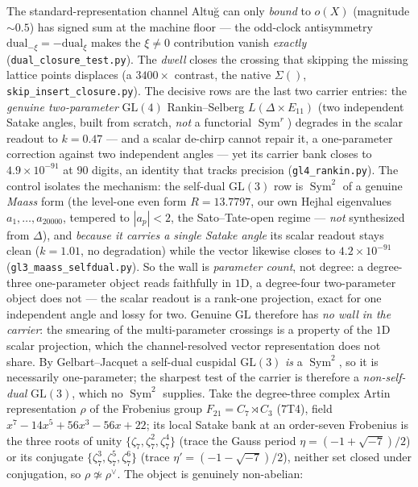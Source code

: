 \documentclass[11pt]{article}
\theoremstyle{definition}
\newcommand{\Sym}{\operatorname{Sym}}
\begin{document}
The standard-representation channel Altu\u{g} can only \emph{bound} to $o(X)$ (magnitude $\sim0.5$) has signed
sum at the machine floor --- the odd-clock antisymmetry $\mathrm{dual}_{-\xi}=-\mathrm{dual}_{\xi}$ makes the
$\xi\neq0$ contribution vanish \emph{exactly} (\texttt{dual\_closure\_test.py}). The \emph{dwell} closes the
crossing that skipping the missing lattice points displaces (a $3400\times$ contrast, the native $\Sigma()$,
\texttt{skip\_insert\_closure.py}). The decisive rows are the last two carrier entries: the \emph{genuine
two-parameter} $\mathrm{GL}(4)$ Rankin--Selberg $L(\Delta\times E_{11})$ (two independent Satake angles, built
from scratch, \emph{not} a functorial $\Sym^r$) degrades in the scalar readout to $k=0.47$ --- and a scalar
de-chirp cannot repair it, a one-parameter correction against two independent angles --- yet its carrier bank
closes to $4.9\times10^{-91}$ at $90$ digits, an identity that tracks precision (\texttt{gl4\_rankin.py}). The
control isolates the mechanism: the self-dual $\mathrm{GL}(3)$ row is $\Sym^2$ of a genuine \emph{Maass} form
(the level-one even form $R=13.7797$, our own Hejhal eigenvalues $a_1,\dots,a_{20000}$, tempered to $|a_p|<2$,
the Sato--Tate-open regime --- \emph{not} synthesized from $\Delta$), and \emph{because it carries a single
Satake angle} its scalar readout stays clean ($k=1.01$, no degradation) while the vector likewise closes to
$4.2\times10^{-91}$ (\texttt{gl3\_maass\_selfdual.py}). So the wall is \emph{parameter count}, not degree: a
degree-three one-parameter object reads faithfully in $1$D, a degree-four two-parameter object does not --- the
scalar readout is a rank-one projection, exact for one independent angle and lossy for two. Genuine
$\mathrm{GL}$ therefore has \emph{no wall in the carrier}: the smearing of the multi-parameter crossings is a
property of the $1$D scalar projection, which the channel-resolved vector representation does not share.
By Gelbart--Jacquet a self-dual cuspidal $\mathrm{GL}(3)$ \emph{is} a $\Sym^2$, so it is necessarily
one-parameter; the sharpest test of the carrier is therefore a \emph{non-self-dual} $\mathrm{GL}(3)$, which no
$\Sym^2$ supplies. Take the degree-three complex Artin representation $\rho$ of the Frobenius group
$F_{21}=C_7\rtimes C_3$ (7T4), field $x^7-14x^5+56x^3-56x+22$; its local Satake bank at an order-seven
Frobenius is the three roots of unity $\{\zeta_7,\zeta_7^2,\zeta_7^4\}$ (trace the Gauss period
$\eta=(-1+\sqrt{-7})/2$) or its conjugate $\{\zeta_7^3,\zeta_7^5,\zeta_7^6\}$ (trace $\eta'=(-1-\sqrt{-7})/2$),
neither set closed under conjugation, so $\rho\not\simeq\rho^\vee$. The object is genuinely non-abelian:
\end{document}
